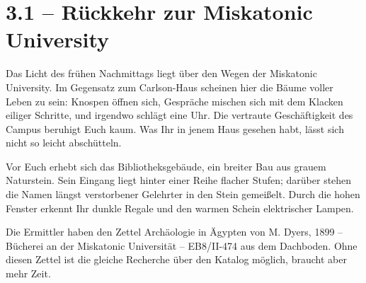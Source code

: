 \section{3.1 -- Rückkehr zur Miskatonic University}
\begin{vorlesetextalle}
Das Licht des frühen Nachmittags liegt über den Wegen der Miskatonic University. Im Gegensatz zum Carlson-Haus scheinen hier die Bäume voller Leben zu sein: Knospen öffnen sich, Gespräche mischen sich mit dem Klacken eiliger Schritte, und irgendwo schlägt eine Uhr. Die vertraute Geschäftigkeit des Campus beruhigt Euch kaum. Was Ihr in jenem Haus gesehen habt, lässt sich nicht so leicht abschütteln.

Vor Euch erhebt sich das Bibliotheksgebäude, ein breiter Bau aus grauem Naturstein. Sein Eingang liegt hinter einer Reihe flacher Stufen; darüber stehen die Namen längst verstorbener Gelehrter in den Stein gemei\ss{}elt. Durch die hohen Fenster erkennt Ihr dunkle Regale und den warmen Schein elektrischer Lampen.
\end{vorlesetextalle}
\begin{meisterinfo}
Die Ermittler haben den Zettel \glqq{}Archäologie in Ägypten von M. Dyers, 1899 -- Bücherei an der Miskatonic Universität -- EB8/II-474\grqq{} aus dem Dachboden. Ohne diesen Zettel ist die gleiche Recherche über den Katalog möglich, braucht aber mehr Zeit.
\end{meisterinfo}

